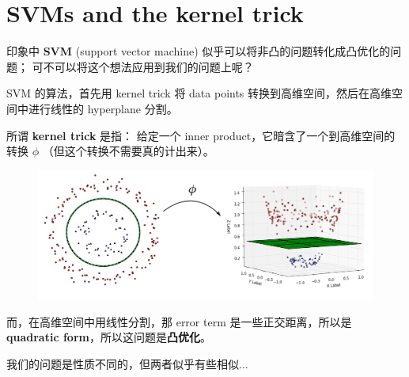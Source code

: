 \documentclass[12pt]{article}
\begin{document}
\section{SVMs and the kernel trick}

印象中 \textbf{SVM} (support vector machine) 似乎可以将非凸的问题转化成凸优化的问题； 可不可以将这个想法应用到我们的问题上呢？

SVM 的算法，首先用 kernel trick 将 data points 转换到高维空间，然后在高维空间中进行线性的 hyperplane 分割。

所谓 \textbf{kernel trick} 是指： 给定一个 inner product，它暗含了一个到高维空间的转换 $\phi$ （但这个转换不需要真的计出来）。


\begin{figure}[H]
\centering
\includegraphics[scale=0.6]{kernel-trick.png}
\end{figure}

而，在高维空间中用线性分割，那 error term 是一些正交距离，所以是 \textbf{quadratic form}，所以这问题是\textbf{凸优化}。


我们的问题是性质不同的，但两者似乎有些相似... 
\end{document}
